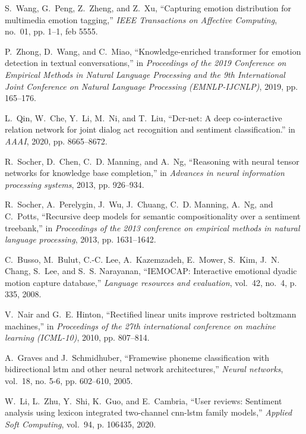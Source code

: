 \documentclass[journal]{IEEEtran}
\begin{document}
\begin{thebibliography}{10}
S.~Wang, G.~Peng, Z.~Zheng, and Z.~Xu, ``Capturing emotion distribution for
  multimedia emotion tagging,'' \emph{IEEE Transactions on Affective
  Computing}, no.~01, pp. 1--1, feb 5555.

P.~Zhong, D.~Wang, and C.~Miao, ``Knowledge-enriched transformer for emotion
  detection in textual conversations,'' in \emph{Proceedings of the 2019
  Conference on Empirical Methods in Natural Language Processing and the 9th
  International Joint Conference on Natural Language Processing
  (EMNLP-IJCNLP)}, 2019, pp. 165--176.

L.~Qin, W.~Che, Y.~Li, M.~Ni, and T.~Liu, ``Dcr-net: A deep co-interactive
  relation network for joint dialog act recognition and sentiment
  classification.'' in \emph{AAAI}, 2020, pp. 8665--8672.

R.~Socher, D.~Chen, C.~D. Manning, and A.~Ng, ``Reasoning with neural tensor
  networks for knowledge base completion,'' in \emph{Advances in neural
  information processing systems}, 2013, pp. 926--934.

R.~Socher, A.~Perelygin, J.~Wu, J.~Chuang, C.~D. Manning, A.~Ng, and C.~Potts,
  ``Recursive deep models for semantic compositionality over a sentiment
  treebank,'' in \emph{Proceedings of the 2013 conference on empirical methods
  in natural language processing}, 2013, pp. 1631--1642.

C.~Busso, M.~Bulut, C.-C. Lee, A.~Kazemzadeh, E.~Mower, S.~Kim, J.~N. Chang,
  S.~Lee, and S.~S. Narayanan, ``{IEMOCAP}: Interactive emotional dyadic motion
  capture database,'' \emph{Language resources and evaluation}, vol.~42, no.~4,
  p. 335, 2008.

V.~Nair and G.~E. Hinton, ``Rectified linear units improve restricted boltzmann
  machines,'' in \emph{Proceedings of the 27th international conference on
  machine learning (ICML-10)}, 2010, pp. 807--814.

A.~Graves and J.~Schmidhuber, ``Framewise phoneme classification with
  bidirectional lstm and other neural network architectures,'' \emph{Neural
  networks}, vol.~18, no. 5-6, pp. 602--610, 2005.

W.~Li, L.~Zhu, Y.~Shi, K.~Guo, and E.~Cambria, ``User reviews: Sentiment
  analysis using lexicon integrated two-channel cnn-lstm family models,''
  \emph{Applied Soft Computing}, vol.~94, p. 106435, 2020.


\end{thebibliography}
\end{document}
